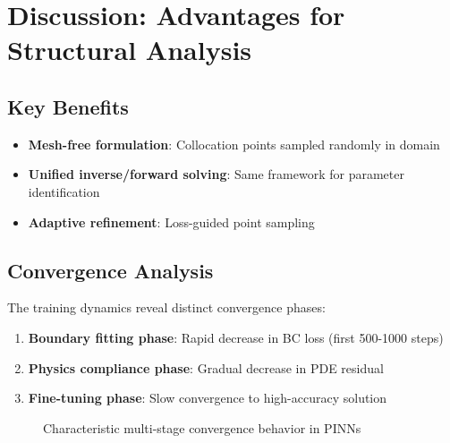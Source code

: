 \documentclass[12pt]{article}
\begin{document}
\section{Discussion: Advantages for Structural Analysis}
\subsection{Key Benefits}
\begin{itemize}
    \item \textbf{Mesh-free formulation}: Collocation points sampled randomly in domain
    \item \textbf{Unified inverse/forward solving}: Same framework for parameter identification
    \item \textbf{Adaptive refinement}: Loss-guided point sampling
\end{itemize}

\subsection{Convergence Analysis}
The training dynamics reveal distinct convergence phases:
\begin{enumerate}
    \item \textbf{Boundary fitting phase}: Rapid decrease in BC loss (first 500-1000 steps)
    \item \textbf{Physics compliance phase}: Gradual decrease in PDE residual
    \item \textbf{Fine-tuning phase}: Slow convergence to high-accuracy solution
\end{enumerate}

\begin{figure}[htbp]
    \centering
    \caption{Characteristic multi-stage convergence behavior in PINNs}
    \label{fig:convergence_stages}
\end{figure}
\end{document}
